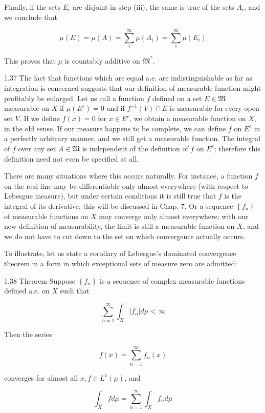 \documentclass[10pt]{article}
\begin{document}
Finally, if the sets $E_{i}$ are disjoint in step (iii), the same is true of the sets $A_{i}$, and we conclude that

$$
\mu(E)=\mu(A)=\sum_{1}^{\infty} \mu\left(A_{i}\right)=\sum_{1}^{\infty} \mu\left(E_{i}\right)
$$

This proves that $\mu$ is countably additive on $\mathfrak{M}^{*}$.

1.37 The fact that functions which are equal a.e. are indistinguishable as far as integration is concerned suggests that our definition of measurable function might profitably be enlarged. Let us call a function $f$ defined on a set $E \in \mathfrak{M}$ measurable on $X$ if $\mu\left(E^{c}\right)=0$ and if $f^{-1}(V) \cap E$ is measurable for every open set $V$. If we define $f(x)=0$ for $x \in E^{c}$, we obtain a measurable function on $X$, in the old sense. If our measure happens to be complete, we can define $f$ on $E^{c}$ in a perfectly arbitrary manner, and we still get a measurable function. The integral of $f$ over any set $A \in \mathfrak{M}$ is independent of the definition of $f$ on $E^{c}$; therefore this definition need not even be specified at all.

There are many situations where this occurs naturally. For instance, a function $f$ on the real line may be differentiable only almost everywhere (with respect to Lebesgue measure), but under certain conditions it is still true that $f$ is the integral of its derivative; this will be discussed in Chap. 7. Or a sequence $\left\{f_{n}\right\}$ of measurable functions on $X$ may converge only almost everywhere; with our new definition of measurability, the limit is still a measurable function on $X$, and we do not have to cut down to the set on which convergence actually occurs.

To illustrate, let us state a corollary of Lebesgue's dominated convergence theorem in a form in which exceptional sets of measure zero are admitted:

1.38 Theorem Suppose $\left\{f_{n}\right\}$ is a sequence of complex measurable functions defined a.e. on $X$ such that

$$
\sum_{n=1}^{\infty} \int_{X}\left|f_{n}\right| d \mu<\infty
$$

Then the series

$$
f(x)=\sum_{n=1}^{\infty} f_{n}(x)
$$

converges for almost all $x, f \in L^{1}(\mu)$, and

$$
\int_{X} f d \mu=\sum_{n=1}^{\infty} \int_{X} f_{n} d \mu
$$
\end{document}
